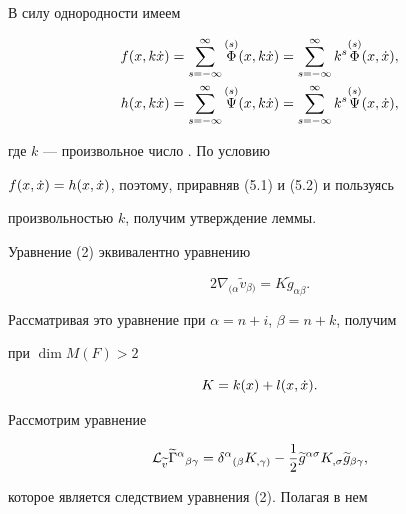\begin{pf} В силу однородности имеем


\begin{equation}


\begin{split}


f(x,k\xt) &= \sum^{\infty}_{s=-\infty}\up{\Phi}{(s)}(x,k\xt) = 


\sum^{\infty}_{s=-\infty} k^s\up{\Phi}{(s)}(x,\xt), \\


h(x,k\xt) &= \sum^{\infty}_{s=-\infty}\up{\Psi}{(s)}(x,k\xt) = 


\sum^{\infty}_{s=-\infty} k^s\up{\Psi}{(s)}(x,\xt),


\end{split}


\end{equation}


где $k$ --- произвольное число . По условию


$f(x,\Dot x) = h(x,\Dot x)$, поэтому, приравняв (5.1) и (5.2) и пользуясь 


произвольностью $k$, получим утверждение леммы.





Уравнение (2) эквивалентно уравнению


$$


2\nabla_{(\alpha}{\widetilde v}_{\beta)}=K{\widetilde g}_{\alpha\beta}.


$$


Рассматривая это уравнение при $\alpha = n + i$, $\beta = n + k$, получим


при $\dim M(F) > 2$


$$


K = k(x) + l(x,\xt).


$$


Рассмотрим уравнение


\begin{equation}


{\lie}_{\widetilde{v}}


{\widetilde{\Gamma }}^{\alpha }{}_{\beta \gamma} = 


\delta^{\alpha}{}_{(\beta}K_{,\gamma)} - \frac{1}{2}


{\widetilde g}^{\alpha\sigma}K_{,\sigma}{\widetilde g}_{\beta\gamma},


\end{equation}


которое является следствием уравнения (2). Полагая в нем



\end{pf}
